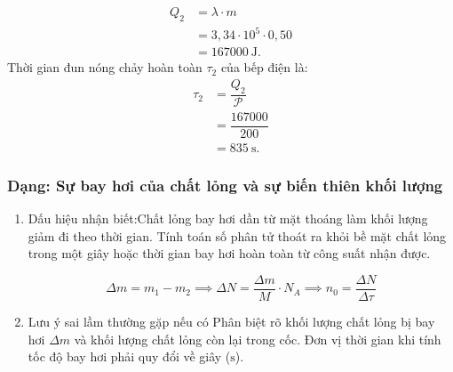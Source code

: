 \begin{vidumau}
{\begin{enumerate}
		\[
		\begin{aligned}
			Q_2 &= \lambda \cdot m \\
			&= 3{,}34 \cdot 10^5 \cdot 0{,}50 \\
			&= 167000\ \mathrm{J}.
		\end{aligned}
		\]
		Thời gian đun nóng chảy hoàn toàn $\tau_2$ của bếp điện là:
		\[
		\begin{aligned}
			\tau_2 &= \dfrac{Q_2}{\mathscr{P}} \\
			&= \dfrac{167000}{200} \\
			&= 835\ \mathrm{s}.
		\end{aligned}
		\]
	\end{enumerate}
}
\end{vidumau}

\subsubsection{Dạng: Sự bay hơi của chất lỏng và sự biến thiên khối lượng}

\begin{phuongphap}
	\begin{enumerate}
		\item Dấu hiệu nhận biết:Chất lỏng bay hơi dần từ mặt thoáng làm khối lượng giảm đi theo thời gian. Tính toán số phân tử thoát ra khỏi bề mặt chất lỏng trong một giây hoặc thời gian bay hơi hoàn toàn từ công suất nhận được.

			\begin{equation}
				\Delta m = m_1 - m_2 \implies \Delta N = \dfrac{\Delta m}{M} \cdot N_A \implies n_0 = \dfrac{\Delta N}{\Delta \tau}
				\label{eq:evap_rate}
		\end{equation}
		\item Lưu ý sai lầm thường gặp nếu có Phân biệt rõ khối lượng chất lỏng bị bay hơi $\Delta m$ và khối lượng chất lỏng còn lại trong cốc. Đơn vị thời gian khi tính tốc độ bay hơi phải quy đổi về giây ($\mathrm{s}$).
	\end{enumerate}
\end{phuongphap}

